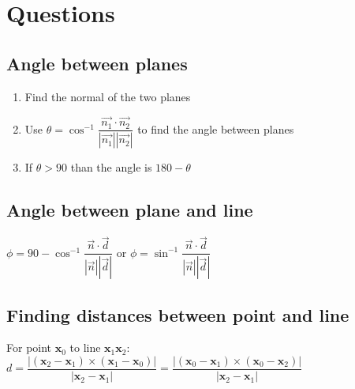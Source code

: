 \section{Questions}
\subsection{Angle between planes}
\begin{enumerate}
    \item Find the normal of the two planes
    \item Use $\theta = \cos^{-1}\dfrac{\vec{n_1}\cdot\vec{n_2}}{|\vec{n_1}||\vec{n_2}|}$ to find the angle between planes
    \item If $\theta>90$ than the angle is $180-\theta$
\end{enumerate}
\subsection{Angle between plane and line}
$\phi = 90-\cos^{-1}\dfrac{\vec{n}\cdot\vec{d}}{|\vec{n}||\vec{d}|}$ or $\phi =\sin^{-1}\dfrac{\vec{n}\cdot\vec{d}}{|\vec{n}||\vec{d}|}$
\subsection{Finding distances between point and line}
For point $\textbf{x}_0$ to line $\textbf{x}_1\textbf{x}_2$: $d=\dfrac{|(\textbf{x}_2-\textbf{x}_1)\times(\textbf{x}_1-\textbf{x}_0)|}{|\textbf{x}_2-\textbf{x}_1|}=\dfrac{|(\textbf{x}_0-\textbf{x}_1)\times(\textbf{x}_0-\textbf{x}_2)|}{|\textbf{x}_2-\textbf{x}_1|}$





